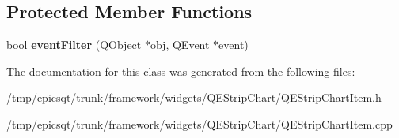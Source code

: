 \subsection*{Protected Member Functions}
\begin{DoxyCompactItemize}
\item 
\hypertarget{classQEStripChartItem_a8752fb56adb000c44608aa630b9eb7dc}{
bool {\bfseries eventFilter} (QObject $\ast$obj, QEvent $\ast$event)}
\label{classQEStripChartItem_a8752fb56adb000c44608aa630b9eb7dc}

\end{DoxyCompactItemize}


The documentation for this class was generated from the following files:\begin{DoxyCompactItemize}
\item 
/tmp/epicsqt/trunk/framework/widgets/QEStripChart/QEStripChartItem.h\item 
/tmp/epicsqt/trunk/framework/widgets/QEStripChart/QEStripChartItem.cpp\end{DoxyCompactItemize}

